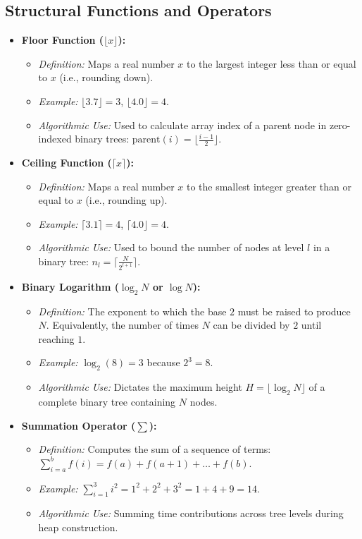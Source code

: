 \documentclass[10pt,journal,compsoc,onecolumn]{IEEEtran}
\begin{document}
\subsection{Structural Functions and Operators}

\begin{itemize}
    \item \textbf{Floor Function ($\lfloor x \rfloor$):}
    \begin{itemize}
        \item \emph{Definition:} Maps a real number $x$ to the largest integer less than or equal to $x$ (i.e., rounding down).
        \item \emph{Example:} $\lfloor 3.7 \rfloor = 3$, $\lfloor 4.0 \rfloor = 4$.
        \item \emph{Algorithmic Use:} Used to calculate array index of a parent node in zero-indexed binary trees: $\text{parent}(i) = \lfloor \frac{i-1}{2} \rfloor$.
    \end{itemize}

    \item \textbf{Ceiling Function ($\lceil x \rceil$):}
    \begin{itemize}
        \item \emph{Definition:} Maps a real number $x$ to the smallest integer greater than or equal to $x$ (i.e., rounding up).
        \item \emph{Example:} $\lceil 3.1 \rceil = 4$, $\lceil 4.0 \rfloor = 4$.
        \item \emph{Algorithmic Use:} Used to bound the number of nodes at level $l$ in a binary tree: $n_l = \lceil \frac{N}{2^{l+1}} \rceil$.
    \end{itemize}

    \item \textbf{Binary Logarithm ($\log_2 N$ or $\log N$):}
    \begin{itemize}
        \item \emph{Definition:} The exponent to which the base $2$ must be raised to produce $N$. Equivalently, the number of times $N$ can be divided by $2$ until reaching $1$.
        \item \emph{Example:} $\log_2(8) = 3$ because $2^3 = 8$.
        \item \emph{Algorithmic Use:} Dictates the maximum height $H = \lfloor \log_2 N \rfloor$ of a complete binary tree containing $N$ nodes.
    \end{itemize}

    \item \textbf{Summation Operator ($\sum$):}
    \begin{itemize}
        \item \emph{Definition:} Computes the sum of a sequence of terms: $\sum_{i=a}^{b} f(i) = f(a) + f(a+1) + \dots + f(b)$.
        \item \emph{Example:} $\sum_{i=1}^{3} i^2 = 1^2 + 2^2 + 3^2 = 1 + 4 + 9 = 14$.
        \item \emph{Algorithmic Use:} Summing time contributions across tree levels during heap construction.
    \end{itemize}


\end{itemize}
\end{document}
